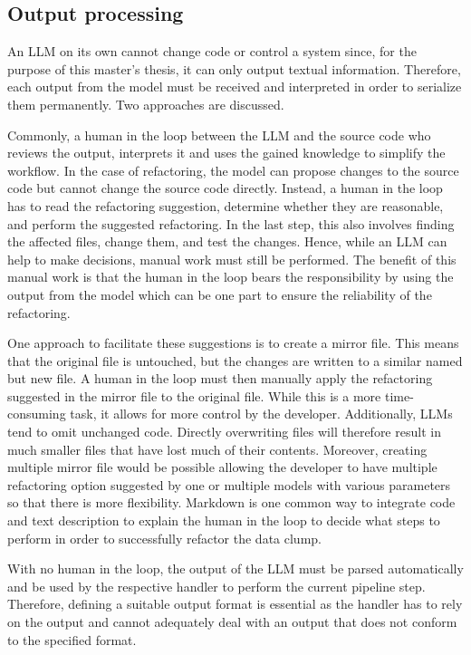 \subsection{Output processing}\label{sec:output_processing}
An \ac{LLM} on its own cannot change code or control a system since, for the purpose of this master's thesis, it  can only output textual information. Therefore, each output from the model must be received and interpreted  in order to serialize them permanently. Two approaches are discussed. 

Commonly, a human in the loop between the \ac{LLM} and the source code who reviews the output, interprets it and uses the gained knowledge to simplify the workflow. In the case of refactoring, the model can propose changes to the source code but cannot change the source code directly. Instead, a human in the loop has to read the refactoring suggestion, determine whether they are reasonable, and perform the suggested refactoring. In the last step, this also involves finding the affected files, change them, and test the changes. Hence, while an \ac{LLM} can help to make decisions, manual work must still be performed. The benefit of this manual work is that the human in the loop bears the responsibility by using the output from the model which can be one part to ensure the reliability of the refactoring. 

One approach to facilitate these suggestions is to create a mirror file. This means that the original file is untouched, but the changes are written to a similar named but new file. A human in the loop must then manually apply the refactoring suggested in the mirror file to the original file. While this is a more time-consuming task, it allows for more control by the developer. Additionally, \acp{LLM} tend to omit unchanged code. Directly overwriting files will therefore result in much smaller files that have lost much of their contents. Moreover, creating multiple mirror file would be possible allowing the developer to have multiple refactoring option suggested by one or multiple models with various parameters so that there is more flexibility. 
Markdown is one common way to integrate code and text description to explain the human in the loop to decide what steps to perform in order to successfully refactor the data clump.  

\bigskip

With no human in the loop, the output of the \ac{LLM} must be parsed automatically and be used by the respective handler to perform the current pipeline step. Therefore, defining a suitable output  format  is essential as the handler has to rely on the output and cannot adequately deal with an output that does not conform to the specified format. 
